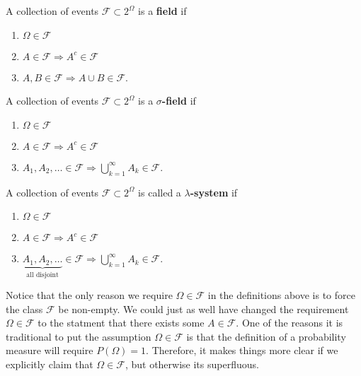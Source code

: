 \begin{definition}[{\bf field}] A collection of events $\mathcal F\subset 2^\Omega$  is a {\bf field} if
\begin{enumerate}
\item $\Omega\in \mathcal F$
\item $A\in\mathcal F\Longrightarrow A^c\in \mathcal F$
\item $A,B\in \mathcal F\Longrightarrow A\cup B\in \mathcal F$.
\end{enumerate}
\end{definition}



\begin{definition}
A collection of events $\mathcal F\subset 2^\Omega$  is a {\bf $\sigma$-field} if
\begin{enumerate}
\item $\Omega\in \mathcal F$
\item $A\in\mathcal F\Longrightarrow A^c\in \mathcal F$
\item $A_1, A_2, \ldots \in \mathcal F\Longrightarrow \bigcup_{k=1}^\infty A_k \in \mathcal F$.
\end{enumerate}
\end{definition}




\begin{definition}
A  collection of events $\mathcal F\subset 2^\Omega$ is called a {\bf $\lambda$-system} if
\begin{enumerate}
\item $\Omega\in \mathcal F$
\item $A\in\mathcal F\Longrightarrow A^c\in \mathcal F$
\item  $\underbrace{A_1, A_2, \ldots}_{\text{all disjoint}} \in \mathcal F \Longrightarrow \bigcup_{k=1}^\infty A_k \in \mathcal F$.
\end{enumerate}
\end{definition}

Notice that the only reason we require $\Omega\in \mathcal F$ in the definitions above is to force the class $\mathcal F$ be non-empty. We could just as well have changed the requirement $\Omega\in \mathcal F$ to the statment that there exists some $A\in \mathcal F$. One of the reasons it is traditional to put the assumption $\Omega\in \mathcal F$ is that the definition of a probability measure will require $P(\Omega)=1$. Therefore, it makes things more clear if we explicitly claim that $\Omega\in \mathcal F$, but otherwise its superfluous.


